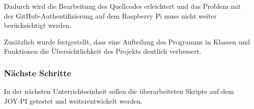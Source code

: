 Dadurch wird die Bearbeitung des Quellcodes erleichtert und das
Problem mit der GitHub-Authentifizierung auf dem Raspberry Pi
muss nicht weiter berücksichtigt werden.

Zusätzlich wurde festgestellt, dass eine Aufteilung des Programms
in Klassen und Funktionen die Übersichtlichkeit des Projekts
deutlich verbessert.

\subsubsection{Nächste Schritte}

In der nächsten Unterrichtseinheit sollen die überarbeiteten
Skripte auf dem JOY-PI getestet und weiterentwickelt werden.